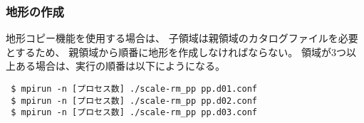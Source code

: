 \subsubsection{地形の作成}

地形コピー機能を使用する場合は、
子領域は親領域のカタログファイルを必要とするため、
親領域から順番に地形を作成しなければならない。
領域が3つ以上ある場合は、実行の順番は以下にようになる。

\begin{verbatim}
 $ mpirun -n [プロセス数] ./scale-rm_pp pp.d01.conf
 $ mpirun -n [プロセス数] ./scale-rm_pp pp.d02.conf
 $ mpirun -n [プロセス数] ./scale-rm_pp pp.d03.conf
\end{verbatim}

